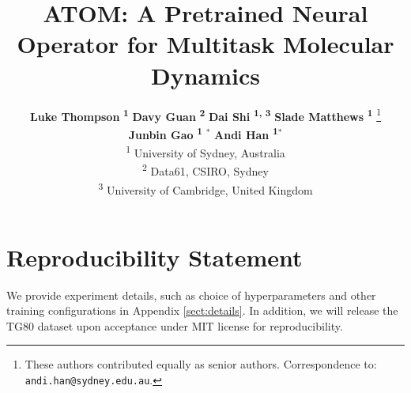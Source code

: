 \documentclass{article}
\title{ATOM: A Pretrained Neural Operator for Multitask Molecular Dynamics}
\author{%
\textbf{Luke Thompson }\!\textsuperscript{\textbf{1}}  
  \quad \textbf{Davy Guan}\! \textsuperscript{\textbf{2}} 
  \quad \textbf{Dai Shi}\! \textsuperscript{\textbf{1, 3}}
  \quad \textbf{Slade Matthews}\! \textsuperscript{\textbf{1}} \!\thanks{These authors contributed equally as senior authors. Correspondence to: \texttt{andi.han@sydney.edu.au}.} \\
  \quad \textbf{Junbin Gao}\! \textsuperscript{\textbf{1}} \!$^*$ 
  \quad \textbf{Andi Han}\! \textsuperscript{\textbf{1}}$^*$
  \\
  \textsuperscript{1} University of Sydney, Australia \\
  \textsuperscript{2} Data61, CSIRO, Sydney \\
  \textsuperscript{3} University of Cambridge, United Kingdom\\ 
}
\begin{document}
\maketitle



\section*{Reproducibility Statement}
We provide experiment details, such as choice of hyperparameters and other training configurations in Appendix \ref{sect:details}. In addition, we will release the TG80 dataset upon acceptance under MIT license for reproducibility.





\appendix

\end{document}
